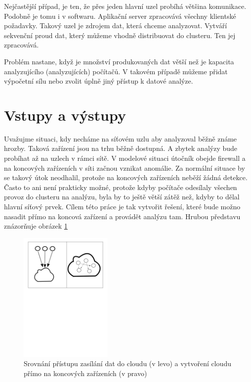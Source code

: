 \documentclass[
  digital, %
  table,   %
  nolof,     %
  nolot,     %
  oneside, %
  nocover,
  monochrome,
  12pt
]{fithesis3}
\begin{document}
Nejčastější případ, je ten, že přes jeden hlavní uzel probíhá většina komunikace. Podobně je tomu i v softwaru. Aplikační server zpracovává všechny klientské požadavky. Takový uzel je zdrojem dat, která chceme analyzovat. Vytváří sekvenční proud dat, který můžeme vhodně distribuovat do clusteru. Ten jej zpracovává.

Problém nastane, když je množství produkovaných dat větší než je kapacita analyzujícího (analyzujících) počítačů. V takovém případě můžeme přidat výpočetní sílu nebo zvolit úplně jiný přístup k datové analýze.

\section{Vstupy a výstupy}
Uvažujme situaci, kdy necháme na síťovém uzlu aby analyzoval běžně známe hrozby. Taková zařízení jsou na trhu běžně dostupná. A zbytek analýzy bude probíhat až na uzlech v rámci sítě. V modelové situaci útočník obejde firewall a na koncových zařízeních v síti začnou vznikat anomálie. Za normální situace by se takový útok neodhalil, protože na koncových zařízeních neběží žádná detekce. Často to ani není prakticky možné, protože kdyby počítače odesílaly všechen provoz do clusteru na analýzu, byla by to ještě větší zátěž než, kdyby to dělal hlavní síťový prvek. Cílem této práce je tak vytvořit řešení, které bude možno nasadit přímo na koncová zařízení a provádět analýzu tam. Hrubou představu znázorňuje obrázek \ref{fig:cloud-comparison}

\begin{figure}[H]
	\centering
    \includegraphics[width=0.4\textwidth, height=0.35\textheight]{images/cloud-comparison.png}
    \caption{Srovnání přístupu zasílání dat do cloudu (v levo) a vytvoření cloudu přímo na koncových zařízeních (v pravo)}
    \label{fig:cloud-comparison}
\end{figure}
\end{document}

